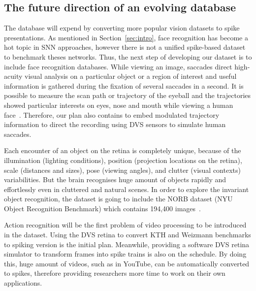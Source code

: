 \subsection{The future direction of an evolving database}
The database will expend by converting more popular vision datasets to spike presentations.
As mentioned in Section~\ref{sec:intro}, face recognition has become a hot topic in SNN approaches, however there is not a unified spike-based dataset to benchmark theses networks.
Thus, the next step of developing our dataset is to include face recognition databases.
While viewing an image,  saccades direct high-acuity visual analysis on a particular object or a region of interest and useful information is gathered during the fixation of several saccades in a second.
It is possible to measure the scan path or trajectory of the eyeball and the trajectories showed particular interests on eyes, nose and mouth while viewing a human face~\citep{yarbus1967eye}.
Therefore, our plan also contains to embed modulated trajectory information to direct the recording using DVS sensors to simulate human saccades.


Each encounter of an object on the retina is completely unique, because of the illumination (lighting conditions), position (projection locations on the retina), scale (distances and sizes), pose (viewing angles), and clutter (visual contexts) variabilities.
But the brain recognises huge amount of objects rapidly and effortlessly even in cluttered and natural scenes.
In order to explore the invariant object recognition, the dataset is going to include the NORB dataset (NYU Object Recognition Benchmark) which contains 194,400  images~\citep{lecun2004learning}.

Action recognition will be the first problem of video processing to be introduced in the dataset.
Using the DVS retina to convert KTH and Weizmann benchmarks to spiking version is the initial plan.
Meanwhile, providing a software DVS retina simulator to transform  frames into spike trains is also on the schedule.
By doing this, huge amount of videos, such as in YouTube, can be automatically converted to spikes, therefore providing researchers more time to work on their own applications.


